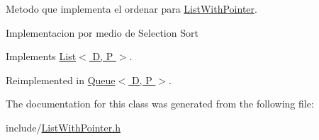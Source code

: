 Metodo que implementa el ordenar para \hyperlink{class_list_with_pointer}{List\+With\+Pointer}. 

Implementacion por medio de Selection Sort 

Implements \hyperlink{class_list_ae3795939f27cf3e688cd470450e0c27a}{List$<$ D, P $>$}.



Reimplemented in \hyperlink{class_queue_a896b0e1bcac0d660079eb838c1823446}{Queue$<$ D, P $>$}.



The documentation for this class was generated from the following file\+:\begin{DoxyCompactItemize}
\item 
include/\hyperlink{_list_with_pointer_8h}{List\+With\+Pointer.\+h}\end{DoxyCompactItemize}
